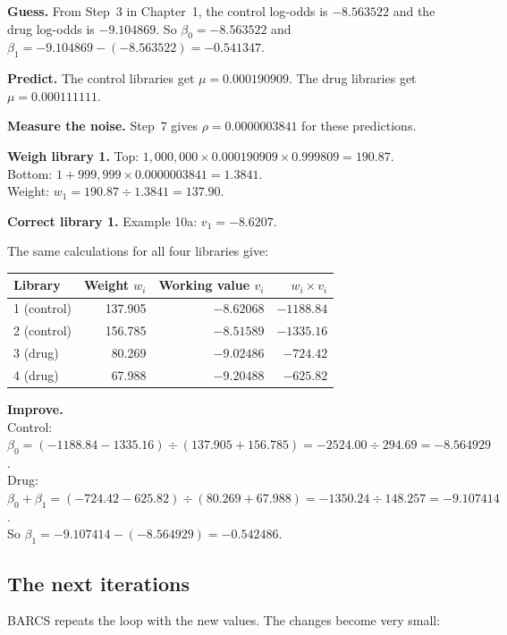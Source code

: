 \begin{worked}[ 10b: iteration 1]
\textbf{Guess.} From Step~3 in Chapter~1, the control log-odds is $-8.563522$ and the
drug log-odds is $-9.104869$. So $\beta_0 = -8.563522$ and
$\beta_1 = -9.104869 - (-8.563522) = -0.541347$.

\textbf{Predict.} The control libraries get $\mu = 0.000190909$. The drug
libraries get $\mu = 0.000111111$.

\textbf{Measure the noise.} Step~7 gives $\rho = 0.0000003841$ for these
predictions.

\textbf{Weigh library 1.}
Top: $1{,}000{,}000 \times 0.000190909 \times 0.999809 = 190.87$.\\
Bottom: $1 + 999{,}999 \times 0.0000003841 = 1.3841$.\\
Weight: $w_1 = 190.87 \div 1.3841 = 137.90$.

\textbf{Correct library 1.} Example 10a: $v_1 = -8.6207$.

The same calculations for all four libraries give:

\begin{tabular}{@{}lrrr@{}}
\toprule
Library & Weight $w_i$ & Working value $v_i$ & $w_i \times v_i$\\
\midrule
1 (control) & 137.905 & $-8.62068$ & $-1188.84$\\
2 (control) & 156.785 & $-8.51589$ & $-1335.16$\\
3 (drug)    &  80.269 & $-9.02486$ &  $-724.42$\\
4 (drug)    &  67.988 & $-9.20488$ &  $-625.82$\\
\bottomrule
\end{tabular}

\textbf{Improve.}\\
Control: $\beta_0 = (-1188.84 - 1335.16) \div (137.905 + 156.785)
 = -2524.00 \div 294.69 = -8.564929$.\\
Drug: $\beta_0 + \beta_1 = (-724.42 - 625.82) \div (80.269 + 67.988)
 = -1350.24 \div 148.257 = -9.107414$.\\
So $\beta_1 = -9.107414 - (-8.564929) = -0.542486$.
\end{worked}

\subsection{The next iterations}

BARCS repeats the loop with the new values. The changes become very small:

